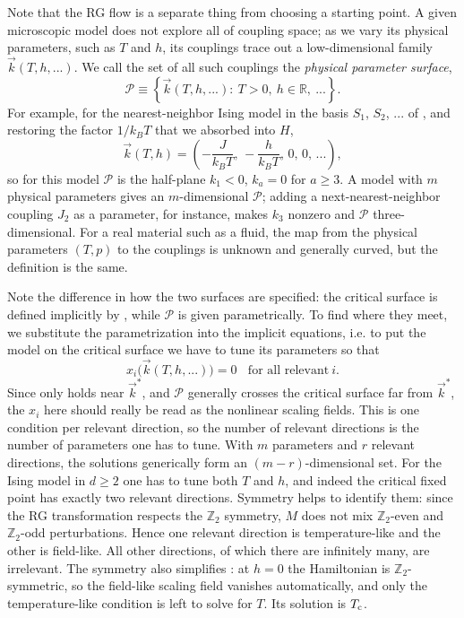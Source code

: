 Note that the RG flow is a separate thing from choosing a starting point. A
given microscopic model does not explore all of coupling space; as we vary its
physical parameters, such as $T$ and $h$, its couplings trace out a
low-dimensional family $\vec{k}(T,h,...)$. We call the set of all such couplings
the {\it physical parameter surface},
\begin{equation}\label{eq:physicalSurface}
  \mathcal{P}\equiv\left\{\vec{k}(T,h,...):~T>0,~h\in\mathbb{R},~...\right\}.
\end{equation}
For example, for the nearest-neighbor Ising model in the basis $S_1$, $S_2$,
... of , and restoring the factor $1/k_BT$ that we absorbed
into $H$,
\begin{equation}\label{eq:physicalSurfaceIsing}
  \vec{k}(T,h)=\left(-\frac{J}{k_BT},\,-\frac{h}{k_BT},\,0,\,0,\,...\right),
\end{equation}
so for this model $\mathcal{P}$ is the half-plane $k_1<0$, $k_a=0$ for $a\geq3$.
A model with $m$ physical parameters gives an $m$-dimensional $\mathcal{P}$;
adding a next-nearest-neighbor coupling $J_2$ as a parameter, for instance,
makes $k_3$ nonzero and $\mathcal{P}$ three-dimensional. For a real material
such as a fluid, the map from the physical parameters $(T,p)$ to the couplings
is unknown and generally curved, but the definition is the same.

Note the difference in how the two surfaces are specified: the critical surface
is defined implicitly by , while $\mathcal{P}$
is given parametrically. To find where they meet, we substitute the
parametrization into the implicit equations, i.e. to put the model on the
critical surface we have to tune its parameters so that
\begin{equation}\label{eq:tuningCondition}
  x_i\big(\vec{k}(T,h,...)\big)=0~~~~\text{for all relevant}~i.
\end{equation}
Since  only holds near $\vec{k}^*$, and
$\mathcal{P}$ generally crosses the critical surface far from $\vec{k}^*$, the
$x_i$ here should really be read as the nonlinear scaling fields.
This is one condition per relevant direction, so the number of relevant
directions is the number of parameters one has to tune. With $m$ parameters and
$r$ relevant directions, the solutions generically form an $(m-r)$-dimensional
set. For the Ising
model in $d\geq2$ one has to tune both $T$ and $h$, and indeed the critical
fixed point has exactly two relevant directions. Symmetry helps to identify
them: since the RG transformation respects the $\mathbb{Z}_2$ symmetry, $M$ does
not mix $\mathbb{Z}_2$-even and $\mathbb{Z}_2$-odd perturbations. Hence one
relevant direction is temperature-like and the other is field-like. All other
directions, of which there are infinitely many, are irrelevant. The symmetry
also simplifies : at $h=0$ the Hamiltonian is
$\mathbb{Z}_2$-symmetric, so the field-like scaling field vanishes
automatically, and only the temperature-like condition is left to solve for
$T$. Its solution is $T_{\rm c}$.


